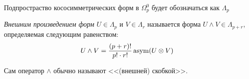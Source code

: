 \begin{designation}
	Подпростраство кососимметрических форм в $\Omega_p^0$ будет обозначаться как $\Lambda_p$
\end{designation}

\begin{definition}
	\textit{Внешним произведением форм} $U \in \Lambda_p$ и $V \in \Lambda_r$ называется форма $U \wedge V \in \Lambda_{p + r}$, определяемая следующим равенством:
	\[
		U \wedge V = \frac{(p + r)!}{p! \cdot r!} \operatorname{asym}(U \otimes V)
	\]
\end{definition}

\begin{note}
	Сам оператор $\wedge$ обычно называют <<(внешней) скобкой>>.
\end{note}